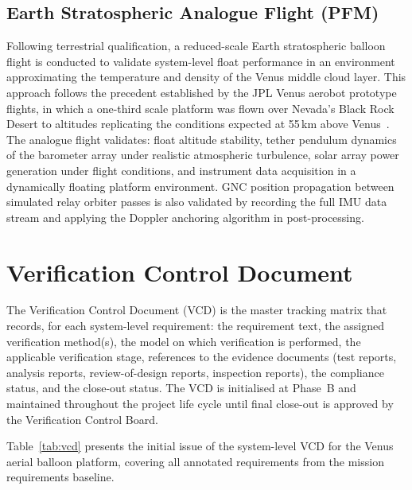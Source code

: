 \subsection{Earth Stratospheric Analogue Flight (PFM)}

Following terrestrial qualification, a reduced-scale Earth stratospheric balloon flight is conducted to validate system-level float performance in an environment approximating the temperature and density of the Venus middle cloud layer. This approach follows the precedent established by the JPL Venus aerobot prototype flights, in which a one-third scale platform was flown over Nevada's Black Rock Desert to altitudes replicating the conditions expected at 55\,km above Venus~\cite{JPL2022}. The analogue flight validates: float altitude stability, tether pendulum dynamics of the barometer array under realistic atmospheric turbulence, solar array power generation under flight conditions, and instrument data acquisition in a dynamically floating platform environment. GNC position propagation between simulated relay orbiter passes is also validated by recording the full IMU data stream and applying the Doppler anchoring algorithm in post-processing.

\section{Verification Control Document}

The Verification Control Document (VCD) is the master tracking matrix that records, for each system-level requirement: the requirement text, the assigned verification method(s), the model on which verification is performed, the applicable verification stage, references to the evidence documents (test reports, analysis reports, review-of-design reports, inspection reports), the compliance status, and the close-out status. The VCD is initialised at Phase~B and maintained throughout the project life cycle until final close-out is approved by the Verification Control Board.

Table~\ref{tab:vcd} presents the initial issue of the system-level VCD for the Venus aerial balloon platform, covering all annotated requirements from the mission requirements baseline.

\newcommand{\crit}{\cellcolor{red!20}}


